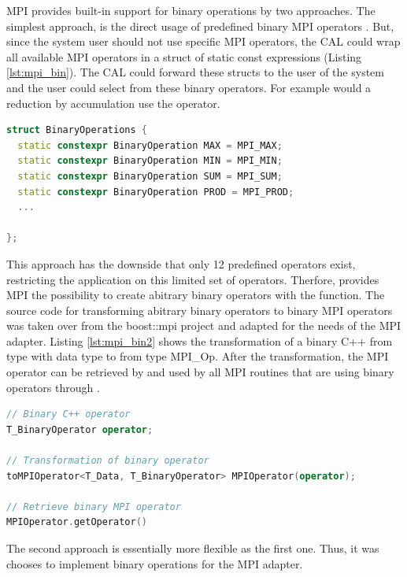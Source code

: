 MPI provides built-in support for binary operations by two approaches. The
simplest approach, is the direct usage of predefined binary MPI
operators \cite{ref:mpi_bin_op}. But, since the system user should not
use specific MPI operators, the CAL could wrap all available MPI
operators in a struct of static const expressions (Listing
\ref{lst:mpi_bin}).  The CAL could forward these structs to the user
of the system and the user could select from these binary operators.
For example would a reduction by accumulation use the
 operator.

\begin{lstlisting}[language=C++, caption={A small collection of binary operators by transformed MPI operations to static constexpression }, label=lst:mpi_bin]
struct BinaryOperations { 
  static constexpr BinaryOperation MAX = MPI_MAX; 
  static constexpr BinaryOperation MIN = MPI_MIN; 
  static constexpr BinaryOperation SUM = MPI_SUM; 
  static constexpr BinaryOperation PROD = MPI_PROD; 
  ...

};
\end{lstlisting}


\noindent This approach has the downside that only 12 predefined
operators exist, restricting the application on this limited set of
operators. Therfore, provides MPI the possibility to create abitrary
binary operators with the  function.  The source
code for transforming abitrary binary operators to binary MPI
operators was taken over from the boost::mpi project
\cite{ref:boost_mpi} and adapted for the needs of the MPI adapter.
Listing \ref{lst:mpi_bin2} shows the transformation of a binary C++
 from type  with data type
 to  from type {MPI\_Op}.  After the
transformation, the MPI operator can be retrieved by and used by all
MPI routines that are using binary operators through
.

\begin{lstlisting}[language=C++, caption={ }, label=lst:mpi_bin2]
// Binary C++ operator
T_BinaryOperator operator;  
  
// Transformation of binary operator
toMPIOperator<T_Data, T_BinaryOperator> MPIOperator(operator);

// Retrieve binary MPI operator
MPIOperator.getOperator()
\end{lstlisting}

\noindent The second approach is essentially more flexible as the
first one. Thus, it was chooses to implement binary operations for the
MPI adapter.


